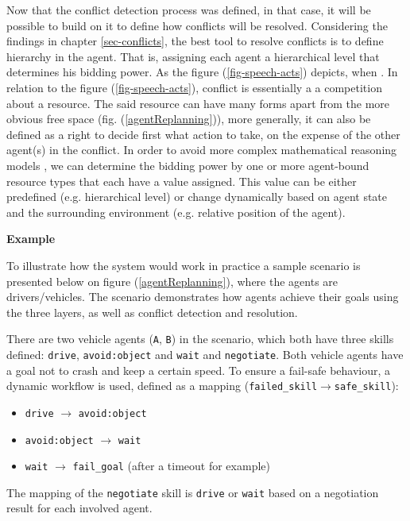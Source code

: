 \documentclass[main.tex]{subfiles}
\begin{document}
Now that the conflict detection process was defined, in that case, it will be possible to build
on it to define how conflicts will be resolved. Considering the findings in chapter \ref{sec-conflicts},
the best tool to resolve conflicts is to define hierarchy in the agent. That is, assigning each agent a 
hierarchical level that determines his bidding power. As the figure (\ref{fig-speech-acts}) depicts, 
when . In relation to the figure (\ref{fig-speech-acts}), conflict is essentially a a competition about a 
resource. The said resource can have many forms apart from the more obvious free space (fig. (\ref{agentReplanning})),
more generally, it can also be defined as a right to decide first what action to take, on the expense of the other agent(s) in 
the conflict. In order to avoid more complex mathematical reasoning models \cite{Binder2022}, we can determine the bidding 
power by one or more agent-bound resource types that each have a value assigned. This value can be either predefined 
(e.g. hierarchical level) or change dynamically based on agent state and the surrounding environment (e.g. relative 
position of the agent). 

\textbf{Example}

To illustrate how the system would work in practice a sample scenario is presented below on
figure (\ref{agentReplanning}), where the agents are drivers/vehicles. The scenario demonstrates 
how agents achieve their goals using the three layers, as well as conflict detection and resolution.

There are two vehicle agents (\texttt{A}, \texttt{B}) in the scenario, which both have three skills defined:
\texttt{drive}, \texttt{avoid:object} and \texttt{wait} and \texttt{negotiate}. Both vehicle
agents have a goal not to crash and keep a certain speed. To ensure a fail-safe behaviour, a
dynamic workflow is used, defined as a mapping
(\texttt{failed\_skill}$\rightarrow$\texttt{safe\_skill}): 

\begin{itemize}
    \item \texttt{drive} $\rightarrow$ \texttt{avoid:object}
    \item \texttt{avoid:object} $\rightarrow$ \texttt{wait}
    \item \texttt{wait} $\rightarrow$ \texttt{fail\_goal} (after a timeout for example)
\end{itemize}

The mapping of the \texttt{negotiate} skill is \texttt{drive} or \texttt{wait} based on 
a negotiation result for each involved agent.
\end{document}
